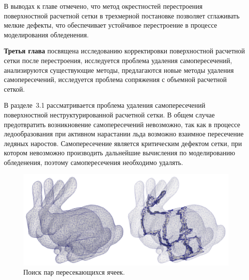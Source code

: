 \documentclass[a4paper,14pt]{extarticle}                     %
\theoremstyle{plain}                                         %
\begin{document}
В выводах к главе отмечено, что метод окрестностей перестроения поверхностной расчетной сетки в трехмерной постановке позволяет сглаживать мелкие дефекты, что обеспечивает устойчивое перестроение в процессе моделирования обледенения.


\textbf{Третья глава} посвящена исследованию корректировки поверхностной расчетной сетки после перестроения, исследуется проблема удаления самопересечений, анализируются существующие методы, предлагаются новые методы удаления самопересечений, исследуется проблема сопряжения с объемной расчетной сеткой.

В разделе~3.1 рассматривается проблема удаления самопересечений поверхностной неструктурированной расчетной сетки.
В общем случае предотвратить возникновение самопересечений невозможно, так как в процессе ледообразования при активном нарастании льда возможно взаимное пересечение ледяных наростов.
Самопересечение является критическим дефектом сетки, при котором невозможно производить дальнейшие вычисления по моделированию обледенения, поэтому самопересечения необходимо удалять.

\begin{figure}[!ht]
\centering
\includegraphics[width=1.0\textwidth]{fig/int_bunnies_dbl.png}
\singlespacing
\caption{Поиск пар пересекающихся ячеек.}
\label{fig:text_1_int_1}
\end{figure}
\end{document}
